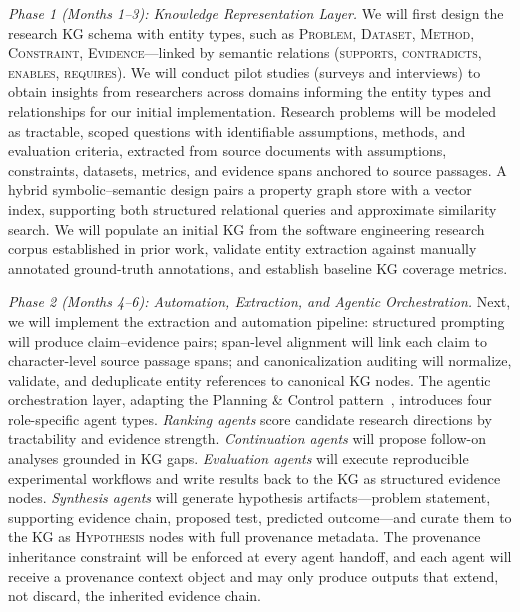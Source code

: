 \documentclass{files/proposalnsf}
\begin{document}
\textit{Phase 1 (Months 1--3): Knowledge Representation Layer.}
We will first design the research KG schema with entity types, such as \textsc{Problem}, \textsc{Dataset}, \textsc{Method}, \textsc{Constraint}, \textsc{Evidence}---linked by semantic relations (\textsc{supports}, \textsc{contradicts}, \textsc{enables}, \textsc{requires}). We will conduct pilot studies (\eg surveys and interviews) to obtain insights from researchers across domains informing the entity types and relationships for our initial implementation. Research problems will be modeled as tractable, scoped questions with identifiable assumptions, methods, and evaluation criteria, extracted from source documents with assumptions, constraints, datasets, metrics, and evidence spans anchored to source passages. A hybrid symbolic--semantic design pairs a property graph store with a vector index, supporting both structured relational queries and approximate similarity search. We will populate an initial KG from the software engineering research corpus established in prior work, validate entity extraction against manually annotated ground-truth annotations, and establish baseline KG coverage metrics.

\textit{Phase 2 (Months 4--6): Automation, Extraction, and Agentic Orchestration.}
Next, we will implement the extraction and automation pipeline: structured prompting will produce claim--evidence pairs; span-level alignment will link each claim to character-level source passage spans; and canonicalization auditing will normalize, validate, and deduplicate entity references to canonical KG nodes. The agentic orchestration layer, adapting the Planning \& Control pattern~\cite{Park2023GenerativeAgents}, introduces four role-specific agent types. \textit{Ranking agents} score candidate research directions by tractability and evidence strength. \textit{Continuation agents} will propose follow-on analyses grounded in KG gaps. \textit{Evaluation agents} will execute reproducible experimental workflows and write results back to the KG as structured evidence nodes. \textit{Synthesis agents} will generate hypothesis artifacts---problem statement, supporting evidence chain, proposed test, predicted outcome---and curate them to the KG as \textsc{Hypothesis} nodes with full provenance metadata. The provenance inheritance constraint will be enforced at every agent handoff, and each agent will receive a provenance context object and may only produce outputs that extend, not discard, the inherited evidence chain.
\end{document}
